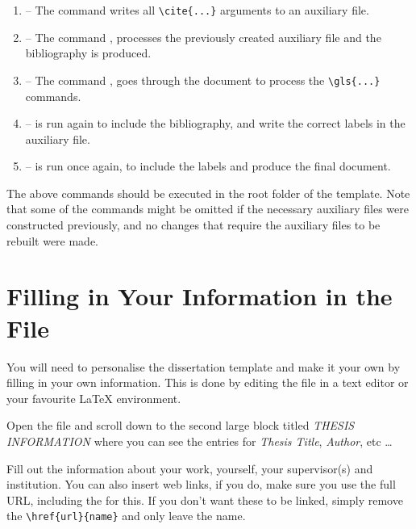 \begin{enumerate}
  \item {} -- The command  writes all \verb|\cite{...}| arguments to an auxiliary file.

  \item {} -- The command , processes the previously created auxiliary file and the bibliography is produced.

  \item {} -- The command , goes through the document to process the \verb|\gls{...}| commands.

  \item {} --  is run again to include the bibliography, and write the correct labels in the auxiliary file.

  \item {} --  is run once again, to include the labels and produce the final document.
\end{enumerate}

The above commands should be executed in the root folder of the template. Note that some of the commands might be omitted if the necessary auxiliary files were constructed previously, and no changes that require the auxiliary files to be rebuilt were made.


\section{Filling in Your Information in the  File}\label{FillingFile}

You will need to personalise the dissertation template and make it your own by filling in your own information. This is done by editing the  file in a text editor or your favourite LaTeX environment.

Open the file and scroll down to the second large block titled \emph{THESIS INFORMATION} where you can see the entries for \emph{Thesis Title}, \emph{Author}, etc \ldots

Fill out the information about your work, yourself, your supervisor(s) and institution. You can also insert web links, if you do, make sure you use the full URL, including the  for this. If you don't want these to be linked, simply remove the \verb|\href{url}{name}| and only leave the name.

